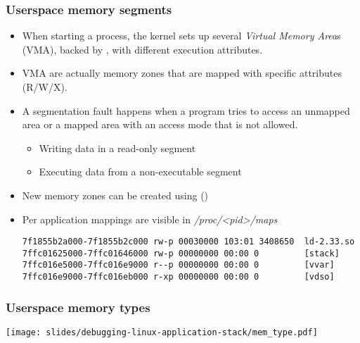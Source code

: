 \begin{frame}[fragile]
  \frametitle{Userspace memory segments}
  \begin{itemize}
    \item When starting a process, the kernel sets up several {\em Virtual
          Memory Area}s (VMA), backed by , with
          different execution attributes.
    \item VMA are actually memory zones that are mapped with specific
          attributes (R/W/X).
    \item A segmentation fault happens when a program tries to access an
      unmapped area or a mapped area with an access mode that is not
      allowed.
    \begin{itemize}
      \item Writing data in a read-only segment
      \item Executing data from a non-executable segment
    \end{itemize}
    \item New memory zones can be created using 
          ()
    \item Per application mappings are visible in {\em /proc/<pid>/maps}\\
    \begin{verbatim}
7f1855b2a000-7f1855b2c000 rw-p 00030000 103:01 3408650  ld-2.33.so
7ffc01625000-7ffc01646000 rw-p 00000000 00:00 0         [stack]
7ffc016e5000-7ffc016e9000 r--p 00000000 00:00 0         [vvar]
7ffc016e9000-7ffc016eb000 r-xp 00000000 00:00 0         [vdso]
    \end{verbatim}
  \end{itemize}
\end{frame}

\begin{frame}[fragile]
  \frametitle{Userspace memory types}
  \center \texttt{[image: slides/debugging-linux-application-stack/mem\_type.pdf]}
\end{frame}

